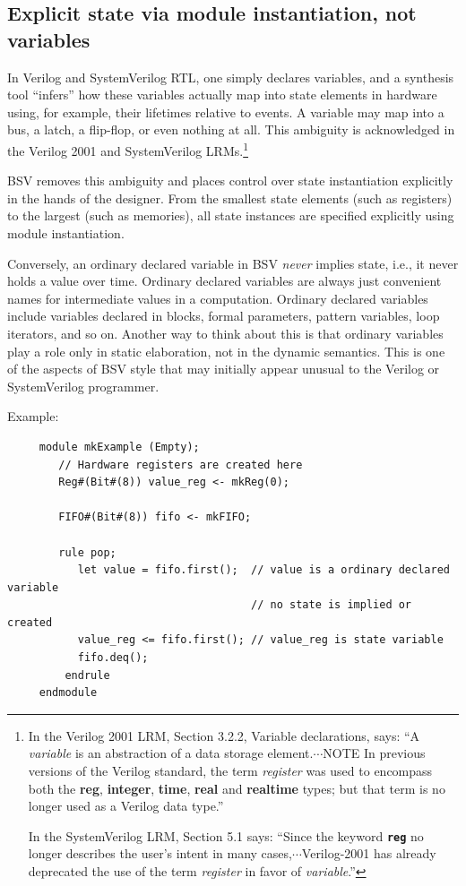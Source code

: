\documentclass[twoside,letterpaper]{article}
\newcommand{\BSV}{BSV}
\newcommand{\SV}{SystemVerilog}
\newcommand{\V}{Verilog}
\newcommand{\VTwoK}{Verilog 2001}
\begin{document}

\subsection{Explicit state via module instantiation, not variables}

In {\V} and {\SV} RTL, one simply declares variables, and a synthesis
tool ``infers'' how these variables actually map into state elements
in hardware using, for example, their lifetimes relative to events.  A
variable may map into a bus, a latch, a flip-flop, or even nothing at
all.  This ambiguity is acknowledged in the {\VTwoK} and {\SV}
LRMs.\footnote{In the {\VTwoK} LRM, Section 3.2.2, Variable
declarations, says: ``A \emph{variable} is an abstraction of a data
storage element.$\cdots$NOTE In previous versions of the Verilog
standard, the term \emph{register} was used to encompass both the {\bf
reg}, {\bf integer}, {\bf time}, {\bf real} and {\bf realtime} types;
but that term is no longer used as a Verilog data type.''

In the {\SV} LRM, Section 5.1 says: ``Since the keyword {\bf\tt reg}
no longer describes the user's intent in many
cases,$\cdots$Verilog-2001 has already deprecated the use of the term
\emph{register} in favor of \emph{variable}.''}

{\BSV} removes this ambiguity and places control over state
instantiation explicitly in the hands of the designer.  From the
smallest state elements (such as registers) to the largest (such as
memories), all state instances are specified explicitly using module
instantiation.

Conversely, an ordinary declared variable in {\BSV} \emph{never}
implies state, i.e., it never holds a value over time.  Ordinary
declared variables are always just convenient names for intermediate
values in a computation.  Ordinary declared variables include
variables declared in blocks, formal parameters, pattern variables,
loop iterators, and so on.  Another way to think about this is that
ordinary variables play a role only in static elaboration, not in the
dynamic semantics. This is one of the aspects of {\BSV} style that
may initially appear unusual to the {\V} or {\SV} programmer.

Example:
\begin{verbatim}
     module mkExample (Empty);
        // Hardware registers are created here
        Reg#(Bit#(8)) value_reg <- mkReg(0);

        FIFO#(Bit#(8)) fifo <- mkFIFO;

        rule pop;
           let value = fifo.first();  // value is a ordinary declared variable
                                      // no state is implied or created
           value_reg <= fifo.first(); // value_reg is state variable
           fifo.deq();
         endrule
     endmodule
\end{verbatim}
\end{document}
